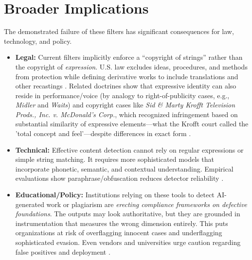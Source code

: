 \documentclass[12pt]{article}
\begin{document}
\section{Broader Implications}
The demonstrated failure of these filters has significant consequences for law, technology, and policy.
\begin{itemize}
    \item \textbf{Legal:} Current filters implicitly enforce a ``copyright of strings'' rather than the copyright of \emph{expression}. U.S. law excludes ideas, procedures, and methods from protection \cite{usc102b} while defining derivative works to include translations and other recastings \cite{usc101}. Related doctrines show that expressive identity can also reside in performance/voice (by analogy to right-of-publicity cases, e.g., \emph{Midler} and \emph{Waits}) and copyright cases like \emph{Sid \& Marty Krofft Television Prods., Inc. v. McDonald’s Corp.}, which recognized infringement based on substantial similarity of expressive elements—what the Krofft court called the 'total concept and feel'—despite differences in exact form  \cite{krofft,midler-ford,usc101,usc102b,waits-fritolay}.
    \item \textbf{Technical:} Effective content detection cannot rely on regular expressions or simple string matching. It requires more sophisticated models that incorporate phonetic, semantic, and contextual understanding. Empirical evaluations show paraphrase/obfuscation reduces detector reliability \cite{barron-cedeno-2013,pan2014-overview,weber-wulff-2023}.
    \item \textbf{Educational/Policy:} Institutions relying on these tools to detect AI-generated work or plagiarism are \emph{erecting compliance frameworks on defective foundations}. The outputs may look authoritative, but they are grounded in instrumentation that measures the wrong dimension entirely. This puts organizations at risk of overflagging innocent cases and underflagging sophisticated evasion. Even vendors and universities urge caution regarding false positives and deployment \cite{turnitin-fp,vanderbilt-turnitin-disabled}.
\end{itemize}
\end{document}
